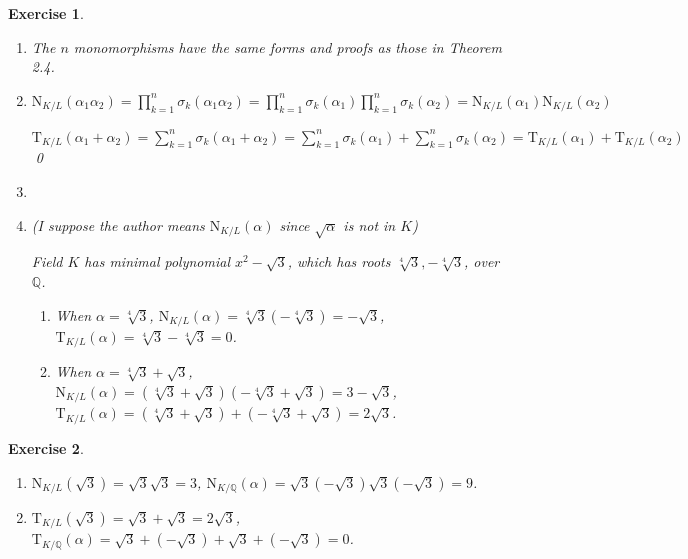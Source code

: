 \documentclass{article}
\theoremstyle{breakstyle}
\newtheorem{exercise}{Exercise}[section]
\begin{document}
\begin{exercise}
    \leavevmode \vspace{-\baselineskip}
    \begin{enumerate}[label=\roman*.]
        \item The $n$ monomorphisms have the same forms and proofs as those in \emph{Theorem 2.4}.
        
        \item $\mathrm{N}_{K/L}(\alpha_1 \alpha_2) = \prod_{k=1}^n \sigma_k(\alpha_1 \alpha_2) = \prod_{k=1}^n \sigma_k(\alpha_1) \prod_{k=1}^n \sigma_k(\alpha_2) = \mathrm{N}_{K/L}(\alpha_1) \mathrm{N}_{K/L}(\alpha_2)$
        
        $\mathrm{T}_{K/L}(\alpha_1 + \alpha_2) = \sum_{k=1}^n \sigma_k(\alpha_1 + \alpha_2) = \sum_{k=1}^n \sigma_k(\alpha_1) + \sum_{k=1}^n \sigma_k(\alpha_2) = \mathrm{T}_{K/L}(\alpha_1) + \mathrm{T}_{K/L}(\alpha_2)$
        \qed
        
        \item
        
        \item \emph{(I suppose the author means} $\mathrm{N}_{K/L}(\alpha)$ \emph{since} $\sqrt{\alpha}$ \emph{is not in} $K$\emph{)}
        
        Field $K$ has minimal polynomial $x^2 - \sqrt{3}$, which has roots $\sqrt[4]{3}, -\sqrt[4]{3}$, over $\mathbb{Q}$.
        \begin{enumerate}[label=\roman*.]
            \item When $\alpha = \sqrt[4]{3}$, $\mathrm{N}_{K/L}(\alpha) = \sqrt[4]{3}(-\sqrt[4]{3}) = -\sqrt{3}$, $\mathrm{T}_{K/L}(\alpha) = \sqrt[4]{3} - \sqrt[4]{3} = 0$.
            
            \item When $\alpha = \sqrt[4]{3} + \sqrt{3}$, $\mathrm{N}_{K/L}(\alpha) = (\sqrt[4]{3} + \sqrt{3})(-\sqrt[4]{3} + \sqrt{3}) = 3 - \sqrt{3}$, $\mathrm{T}_{K/L}(\alpha) = (\sqrt[4]{3} + \sqrt{3}) + (-\sqrt[4]{3} + \sqrt{3}) = 2\sqrt{3}$.
        \end{enumerate}
    \end{enumerate}
\end{exercise}

\begin{exercise}
    \leavevmode \vspace{-\baselineskip}
    \begin{enumerate}[label=\roman*.]
        \item $\mathrm{N}_{K/L}(\sqrt{3}) = \sqrt{3} \sqrt{3} = 3$, $\mathrm{N}_{K/\mathbb{Q}}(\alpha) = \sqrt{3}(-\sqrt{3})\sqrt{3}(-\sqrt{3}) = 9$.
        
        \item $\mathrm{T}_{K/L}(\sqrt{3}) = \sqrt{3} + \sqrt{3} = 2\sqrt{3}$, $\mathrm{T}_{K/\mathbb{Q}}(\alpha) = \sqrt{3} + (-\sqrt{3}) + \sqrt{3} + (-\sqrt{3}) = 0$.
    \end{enumerate}
\end{exercise}
\end{document}
